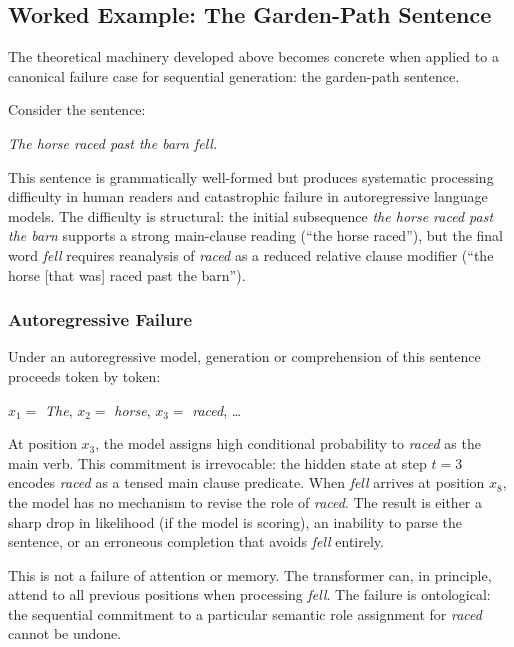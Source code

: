 \documentclass[11pt, a4paper]{article}
\theoremstyle{srn}
\theoremstyle{srnremark}
\begin{document}
\subsection{Worked Example: The Garden-Path Sentence}

The theoretical machinery developed above becomes concrete when applied
to a canonical failure case for sequential generation: the garden-path
sentence.

Consider the sentence:

\begin{center}
  \textit{The horse raced past the barn fell.}
\end{center}

This sentence is grammatically well-formed but produces systematic
processing difficulty in human readers and catastrophic failure in
autoregressive language models.
The difficulty is structural: the initial subsequence \textit{the
horse raced past the barn} supports a strong main-clause reading
(``the horse raced''), but the final word \textit{fell} requires
reanalysis of \textit{raced} as a reduced relative clause modifier
(``the horse [that was] raced past the barn'').

\subsubsection*{Autoregressive Failure}

Under an autoregressive model, generation or comprehension of this
sentence proceeds token by token:

\medskip
\noindent
$x_1 = $ \textit{The}, $x_2 = $ \textit{horse}, $x_3 = $
\textit{raced}, \ldots

\medskip
\noindent
At position $x_3$, the model assigns high conditional probability to
\textit{raced} as the main verb.
This commitment is irrevocable: the hidden state at step $t=3$
encodes \textit{raced} as a tensed main clause predicate.
When \textit{fell} arrives at position $x_8$, the model has no
mechanism to revise the role of \textit{raced}.
The result is either a sharp drop in likelihood (if the model is
scoring), an inability to parse the sentence, or an erroneous
completion that avoids \textit{fell} entirely.

This is not a failure of attention or memory.
The transformer can, in principle, attend to all previous positions
when processing \textit{fell}.
The failure is ontological: the sequential commitment to a particular
semantic role assignment for \textit{raced} cannot be undone.
\end{document}
